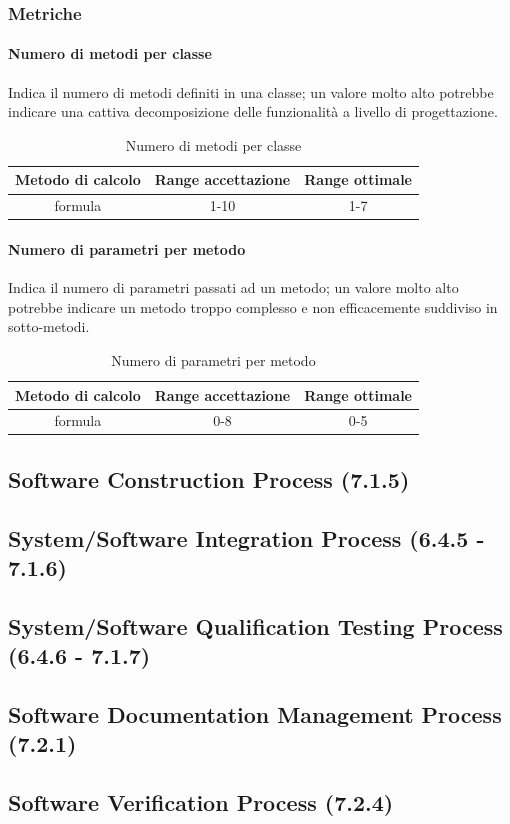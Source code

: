 		\subsubsection{Metriche}
			\paragraph{Numero di metodi per classe}
			Indica il numero di metodi definiti in una classe; un valore molto alto potrebbe indicare una
			cattiva decomposizione delle funzionalità a livello di progettazione.
			\begin{table}[H]
				\begin{center}
					\begin{tabular}{|c|c|c|}
						\hline
						\textbf{Metodo di calcolo} & \textbf{Range accettazione} & \textbf{Range ottimale} \\
						\hline
						formula & 1-10  & 1-7 \\
						\hline
					\end{tabular}
				\end{center}
				\caption{Numero di metodi per classe}
			\end{table}
		
			\paragraph{Numero di parametri per metodo}
			Indica il numero di parametri passati ad un metodo; un valore molto alto potrebbe indicare un
			metodo troppo complesso e non efficacemente suddiviso in sotto-metodi.
			\begin{table}[H]
				\begin{center}
					\begin{tabular}{|c|c|c|}
						\hline
						\textbf{Metodo di calcolo} & \textbf{Range accettazione} & \textbf{Range ottimale} \\
						\hline
						formula & 0-8  & 0-5 \\
						\hline
					\end{tabular}
				\end{center}
				\caption{Numero di parametri per metodo}
			\end{table}
			
	\subsection{Software Construction Process (7.1.5)}
	
	\subsection{System/Software Integration Process (6.4.5 - 7.1.6)}
	
	\subsection{System/Software Qualification Testing Process (6.4.6 - 7.1.7)}
	
	\subsection{Software Documentation Management Process (7.2.1)}
	
	\subsection{Software Verification Process (7.2.4)}
	